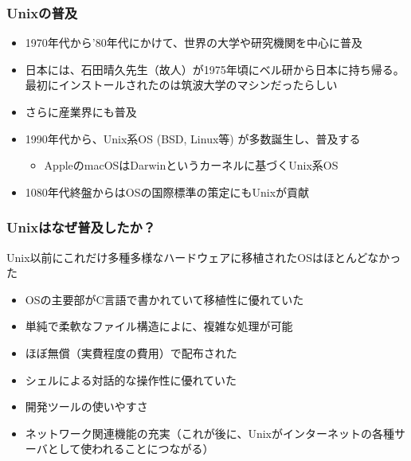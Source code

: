 \documentclass[dvipdfmx]{beamer}
\begin{document}
\begin{frame}
    \frametitle{Unixの普及}
    \begin{itemize}
        \item 1970年代から'80年代にかけて、世界の大学や研究機関を中心に普及
        \item 日本には、石田晴久先生（故人）が1975年頃にベル研から日本に持ち帰る。最初にインストールされたのは筑波大学のマシンだったらしい \cite{sunahara-murai}
        \item さらに産業界にも普及
        \item 1990年代から、Unix系OS (BSD, Linux等) が多数誕生し、普及する
        \begin{itemize}
            \item AppleのmacOSはDarwinというカーネルに基づくUnix系OS
        \end{itemize}
        \item 1080年代終盤からはOSの国際標準の策定にもUnixが貢献
    \end{itemize}
\end{frame}

\begin{frame}
    \frametitle{Unixはなぜ普及したか？}

    \begin{block}{Unix以前にこれだけ多種多様なハードウェアに移植されたOSはほとんどなかった}
        \begin{itemize}
            \item OSの主要部がC言語で書かれていて移植性に優れていた
            \item 単純で柔軟なファイル構造によに、複雑な処理が可能
            \item ほぼ無償（実費程度の費用）で配布された
            \item シェルによる対話的な操作性に優れていた
            \item 開発ツールの使いやすさ
            \item ネットワーク関連機能の充実（これが後に、Unixがインターネットの各種サーバとして使われることにつながる）
        \end{itemize}
    \end{block}
\end{frame}
\end{document}
